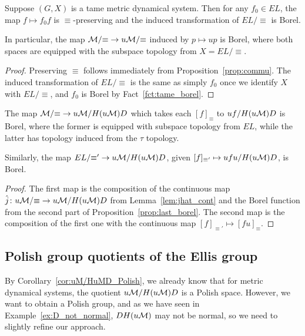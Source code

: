 	\begin{prop}
		\label{prop:last_borel}
		Suppose $(G,X)$ is a tame metric dynamical system. Then for any $f_0\in EL$, the map $f\mapsto f_0f$ is $\equiv$-preserving and the induced transformation of $EL/{\equiv}$ is Borel.
		
		In particular, the map ${\mathcal M}/{\equiv}\to u{\mathcal M}/{\equiv}$ induced by $p\mapsto up$ is Borel, where both spaces are equipped with the subspace topology from $X=EL/{\equiv}$.
	\end{prop}
	\begin{proof}
		Preserving $\equiv$ follows immediately from Proposition~\ref{prop:commu}.
		The induced transformation of $EL/{\equiv}$ is the same as simply $f_0$ once we identify $X$ with $EL/{\equiv}$, and $f_0$ is Borel by Fact~\ref{fct:tame_borel}.
	\end{proof}
	
	\begin{cor}
		\label{cor:borel_map}
		The map ${\mathcal M}/{\equiv}\to u{\mathcal M}/H(u{\mathcal M})D$ which takes each $[f]_\equiv$ to $uf/H(u{\mathcal M})D$ is Borel, where the former is equipped with subspace topology from $EL$, while the latter has topology induced from the $\tau$ topology.
		
		Similarly, the map $EL/{\equiv'}\to u{\mathcal M}/H(u{\mathcal M})D$, given $[f]_{\equiv'}\mapsto ufu/H(u{\mathcal M})D$, is Borel.
	\end{cor}
	\begin{proof}
		The first map is the composition of the continuous map $\hat j\colon u{\mathcal M}/{\equiv}\to u{\mathcal M}/H(u{\mathcal M})D$ from Lemma~\ref{lem:jhat_cont} and the Borel function from the second part of Proposition~\ref{prop:last_borel}. The second map is the composition of the first one with the continuous map $[f]_{\equiv'}\mapsto [fu]_{\equiv}$.
	\end{proof}
	
	
	
	
	
	
	
	\subsection*{Polish group quotients of the Ellis group}
	By Corollary~\ref{cor:uM/HuMD_Polish}, we already know that for metric dynamical systems, the quotient $u{\mathcal M}/H(u{\mathcal M})D$ is a Polish space. However, we want to obtain a Polish group, and as we have seen in Example~\ref{ex:D_not_normal}, $DH(u{\mathcal M})$ may not be normal, so we need to slightly refine our approach.
	
